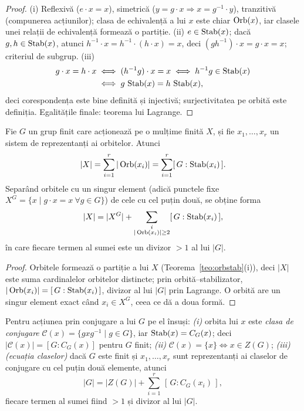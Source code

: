 \begin{proof}
(i) Reflexivă ($e\cdot x=x$), simetrică ($y=g\cdot x\Rightarrow x=g^{-1}\cdot y$), tranzitivă (compunerea acțiunilor); clasa de echivalență a lui $x$ este chiar $\operatorname{Orb}(x)$, iar clasele unei relații de echivalență formează o partiție. (ii) $e\in\operatorname{Stab}(x)$; dacă $g,h\in\operatorname{Stab}(x)$, atunci $h^{-1}\cdot x=h^{-1}\cdot(h\cdot x)=x$, deci $(gh^{-1})\cdot x=g\cdot x=x$; criteriul de subgrup. (iii)
\[
\begin{aligned}
g\cdot x=h\cdot x&\iff(h^{-1}g)\cdot x=x\iff h^{-1}g\in\operatorname{Stab}(x)\\
&\iff g\,\operatorname{Stab}(x)=h\,\operatorname{Stab}(x),
\end{aligned}
\]
deci corespondența este bine definită și injectivă; surjectivitatea pe orbită este definiția. Egalitățile finale: teorema lui Lagrange.
\end{proof}

\begin{teorema}\label{teo:ecclase}
Fie $G$ un grup finit care acționează pe o mulțime finită $X$, și fie $x_1,\dots,x_r$ un sistem de reprezentanți ai orbitelor. Atunci
\[
|X|=\sum_{i=1}^{r}|\operatorname{Orb}(x_i)|=\sum_{i=1}^{r}[\,G:\operatorname{Stab}(x_i)\,].
\]
Separând orbitele cu un singur element (adică punctele fixe $X^{G}=\{x\mid g\cdot x=x\ \forall g\in G\}$) de cele cu cel puțin două, se obține forma
\[
|X|=|X^{G}|+\sum_{\substack{i\\ |\operatorname{Orb}(x_i)|\ge 2}}[\,G:\operatorname{Stab}(x_i)\,],
\]
în care fiecare termen al sumei este un divizor $>1$ al lui $|G|$.
\end{teorema}

\begin{proof}
Orbitele formează o partiție a lui $X$ (Teorema~\ref{teo:orbstab}(i)), deci $|X|$ este suma cardinalelor orbitelor distincte; prin orbită--stabilizator, $|\operatorname{Orb}(x_i)|=[\,G:\operatorname{Stab}(x_i)\,]$, divizor al lui $|G|$ prin Lagrange. O orbită are un singur element exact când $x_i\in X^{G}$, ceea ce dă a doua formă.
\end{proof}

\begin{teorema}\label{teo:clase}
Pentru acțiunea prin conjugare a lui $G$ pe el însuși:
\emph{(i)} orbita lui $x$ este \emph{clasa de conjugare} $\mathcal C(x)=\{gxg^{-1}\mid g\in G\}$, iar $\operatorname{Stab}(x)=C_G(x)$; deci $|\mathcal C(x)|=[G:C_G(x)]$ pentru $G$ finit;
\emph{(ii)} $\mathcal C(x)=\{x\}\iff x\in Z(G)$;
\emph{(iii)} \emph{(ecuația claselor)} dacă $G$ este finit și $x_1,\dots,x_r$ sunt reprezentanți ai claselor de conjugare cu cel puțin două elemente, atunci
\[
|G|=|Z(G)|+\sum_{i=1}^{r}\,[\,G:C_G(x_i)\,],
\]
fiecare termen al sumei fiind $>1$ și divizor al lui $|G|$.
\end{teorema}

